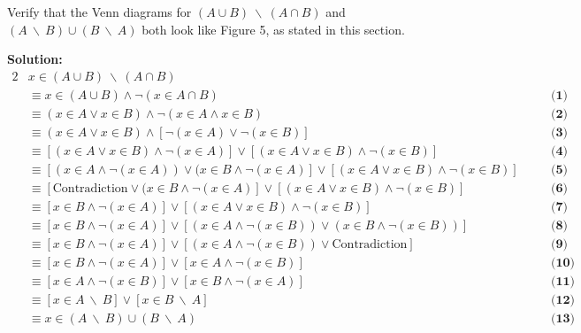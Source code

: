 Verify that the Venn diagrams for $(A \cup B) \: \backslash \: (A \cap B)$ and $(A \: \backslash \: B) \cup (B \: \backslash \: A)$ both look like Figure 5, as stated in this section.

\textbf{Solution:}
\begin{alignat*}{2}
    &x \in (A \cup B) \: \backslash \: (A \cap B)\\
    &\equiv x \in (A \cup B) \wedge \neg (x \in A \cap B) && \quad \textbf{(1)}\\
    &\equiv (x \in A \vee x \in B) \wedge \neg (x \in A \wedge x \in B) && \quad \textbf{(2)}\\
    &\equiv (x \in A \vee x \in B) \wedge [\neg (x \in A) \vee \neg (x \in B)] && \quad \textbf{(3)}\\
    &\equiv [(x \in A \vee x \in B) \wedge \neg (x \in A)] \vee [(x \in A \vee x \in B) \wedge \neg (x \in B)] && \quad \textbf{(4)}\\
    &\equiv [(x \in A \wedge \neg (x \in A)) \vee (x \in B \wedge \neg (x \in A) ] \vee [(x \in A \vee x \in B) \wedge \neg (x \in B)] && \quad \textbf{(5)}\\
    &\equiv [\text{Contradiction} \vee (x \in B \wedge \neg (x \in A) ] \vee [(x \in A \vee x \in B) \wedge \neg (x \in B)] && \quad \textbf{(6)}\\
    &\equiv [x \in B \wedge \neg (x \in A)] \vee [(x \in A \vee x \in B) \wedge \neg (x \in B)] && \quad \textbf{(7)}\\
    &\equiv [x \in B \wedge \neg (x \in A)] \vee [(x \in A \wedge \neg (x \in B)) \vee (x \in B \wedge \neg (x \in B))] && \quad \textbf{(8)}\\
    &\equiv [x \in B \wedge \neg (x \in A)] \vee [(x \in A \wedge \neg (x \in B)) \vee \text{Contradiction}] && \quad \textbf{(9)}\\
    &\equiv [x \in B \wedge \neg (x \in A)] \vee [x \in A \wedge \neg (x \in B)] && \quad \textbf{(10)}\\
    &\equiv [x \in A \wedge \neg (x \in B)] \vee [x \in B \wedge \neg (x \in A) ] && \quad \textbf{(11)}\\
    &\equiv [x \in A \: \backslash \: B] \vee [ x \in B \: \backslash \: A] && \quad \textbf{(12)}\\
    &\equiv x \in (A \: \backslash \: B) \cup (B \: \backslash \: A) && \quad \textbf{(13)}
\end{alignat*}

